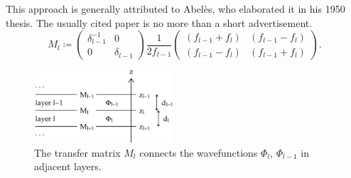 {This approach is generally attributed to Abelès,
who elaborated it in his 1950 thesis.
The usually cited paper \cite{Abe50a} is no more than a short advertisement.}
\begin{equation}\label{EMil}
  M_l
   \coloneqq
   \left(\begin{array}{cc}
     \delta_{l-1}^{-1}&0\\
       0 & \delta_{l-1}
   \end{array}\right)
   \frac{1}{2f_{l-1}}
   \left(\begin{array}{cc}
       (f_{l-1}+f_l)&(f_{l-1}-f_l)\\
       (f_{l-1}-f_l)&(f_{l-1}+f_l)
   \end{array}\right).
\end{equation}

\begin{figure}[tb]
\begin{center}
\includegraphics[width=0.46\textwidth]{fig/drawing/multilayer_boundary.ps}
\end{center}
\caption{The transfer matrix $M_l$ connects the wavefunctions
%
%
%
$\Phi_l$, $\Phi_{l-1}$ in adjacent layers.}
\label{Fboundary}
\end{figure}

